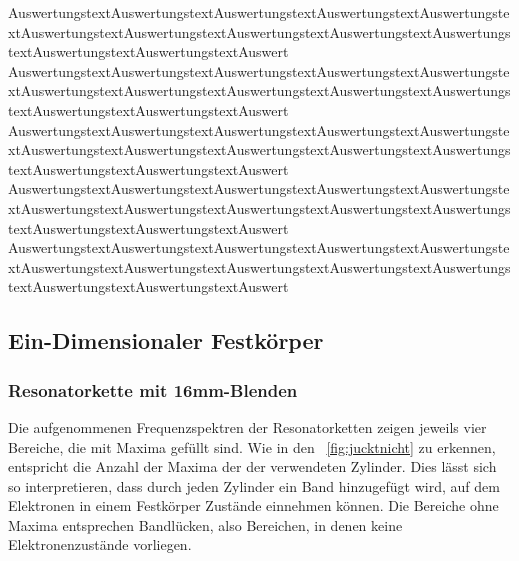             AuswertungstextAuswertungstextAuswertungstextAuswertungstextAuswertungstextAuswertungstextAuswertungstextAuswertungstextAuswertungstextAuswertungstextAuswertungstextAuswertungstextAuswert
            AuswertungstextAuswertungstextAuswertungstextAuswertungstextAuswertungstextAuswertungstextAuswertungstextAuswertungstextAuswertungstextAuswertungstextAuswertungstextAuswertungstextAuswert
            AuswertungstextAuswertungstextAuswertungstextAuswertungstextAuswertungstextAuswertungstextAuswertungstextAuswertungstextAuswertungstextAuswertungstextAuswertungstextAuswertungstextAuswert
            AuswertungstextAuswertungstextAuswertungstextAuswertungstextAuswertungstextAuswertungstextAuswertungstextAuswertungstextAuswertungstextAuswertungstextAuswertungstextAuswertungstextAuswert
            AuswertungstextAuswertungstextAuswertungstextAuswertungstextAuswertungstextAuswertungstextAuswertungstextAuswertungstextAuswertungstextAuswertungstextAuswertungstextAuswertungstextAuswert

    \subsection{Ein-Dimensionaler Festkörper}
        \subsubsection*{Resonatorkette mit 16mm-Blenden}
            Die aufgenommenen Frequenzspektren der Resonatorketten zeigen jeweils vier Bereiche, die mit Maxima gefüllt sind. Wie in den 
            ~\autoref{fig:jucktnicht} zu erkennen, entspricht die Anzahl der Maxima der der verwendeten Zylinder. Dies lässt sich so 
            interpretieren, dass durch jeden Zylinder ein Band hinzugefügt wird, auf dem Elektronen in einem Festkörper Zustände einnehmen können. Die Bereiche ohne Maxima entsprechen Bandlücken, also Bereichen,
            in denen keine Elektronenzustände vorliegen.     
            
